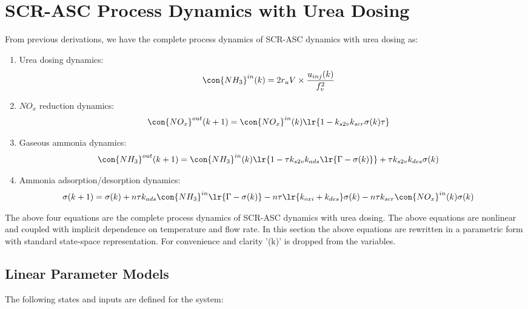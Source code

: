 \newpage
\section{SCR-ASC Process Dynamics with Urea Dosing \label{sec::proc_dyn}}
From previous derivations, we have the complete process dynamics of SCR-ASC dynamics with urea dosing as:

\begin{enumerate}
    \item Urea dosing dynamics:
    \begin{align*}
    \con{NH_3}^{in} (k) &= 2r_u V \times \frac{u_{inj}(k)}{f_v^2}
    \end{align*}

    \item $NO_x$ reduction dynamics:
    \begin{align*}
    \con{NO_x}^{out} (k + 1) &= \con{NO_x}^{in} (k) \lr{1 - k_{s2v} k_{scr} \sigma(k) \tau}
    \end{align*}

    \item Gaseous ammonia dynamics:
    \begin{align*}
    \con{NH_3}^{out} (k + 1) &= \con{NH_3}^{in}(k) \lr{1 - \tau k_{s2v}k_{ads} \lr{\Gamma - \sigma(k)}} + \tau k_{s2v} k_{des} \sigma(k)
    \end{align*}

    \item Ammonia adsorption/desorption dynamics:
 \begin{align*}
        \sigma(k + 1) &= \sigma(k)
        + n\tau k_{ads} \con{NH_3}^{in} \lr{\Gamma - \sigma(k)}
        - n \tau \lr{k_{oxi} + k_{des}} \sigma(k)
        - n \tau k_{scr} \con{NO_x}^{in}(k) \sigma(k)
    \end{align*}
\end{enumerate}

The above four equations are the complete process dynamics of SCR-ASC dynamics with urea dosing. The above equations are
nonlinear and coupled with implicit dependence on temperature and flow rate. In this section the above equations are
rewritten in a parametric form with standard state-space representation. For convenience and clarity '(k)' is dropped
from the variables.

\subsection{Linear Parameter Models}
The following states and inputs are defined for the system:

